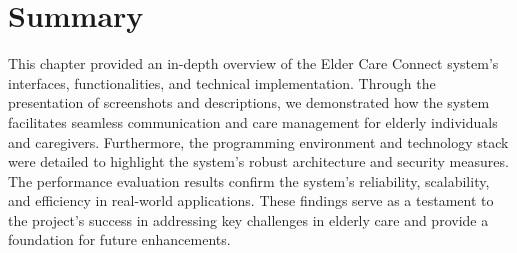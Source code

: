 \section{Summary}
This chapter provided an in-depth overview of the Elder Care Connect system’s interfaces, functionalities, and technical implementation. Through the presentation of screenshots and descriptions, we demonstrated how the system facilitates seamless communication and care management for elderly individuals and caregivers. Furthermore, the programming environment and technology stack were detailed to highlight the system’s robust architecture and security measures. The performance evaluation results confirm the system’s reliability, scalability, and efficiency in real-world applications. These findings serve as a testament to the project’s success in addressing key challenges in elderly care and provide a foundation for future enhancements.
\newpage
